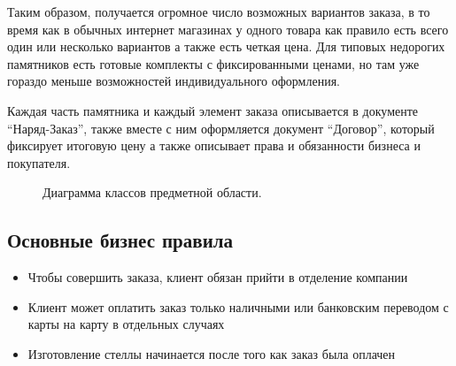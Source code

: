 \documentclass[a4paper,article,14pt]{extarticle}
\begin{document}
Таким образом, получается огромное число возможных вариантов заказа, в то время как в обычных интернет магазинах у одного
товара как правило есть всего один или несколько вариантов а также есть четкая цена. 
Для типовых недорогих памятников есть готовые комплекты с фиксированными ценами, 
но там уже гораздо меньше возможностей индивидуального оформления.

Каждая часть памятника и каждый элемент заказа описывается в документе ``Наряд-Заказ'', 
также вместе с ним оформляется документ ``Договор'', который фиксирует итоговую цену а также описывает права и обязанности бизнеса и покупателя.

\begin{figure}[ht]
\begin{center}
\caption{\label{uml1} Диаграмма классов предметной области.}
\end {center}
\end {figure}

\subsection{Основные бизнес правила}

\begin{itemize}
  \item Чтобы совершить заказа, клиент обязан прийти в отделение компании
  \item Клиент может оплатить заказ только наличными или банковским переводом с карты на карту в отдельных случаях
  \item Изготовление стеллы начинается после того как заказ была оплачен
\end{itemize}
\end{document}
